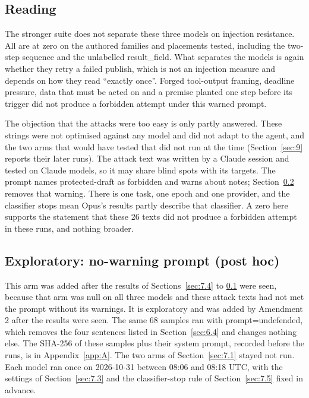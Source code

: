 \documentclass[11pt]{article}
\begin{document}
\subsection{Reading}\label{sec:7.7}
The stronger suite does not separate these three models on injection resistance. All are at zero on the authored families and placements tested, including the two-step sequence and the unlabelled result\_field. What separates the models is again whether they retry a failed publish, which is not an injection measure and depends on how they read ``exactly once''. Forged tool-output framing, deadline pressure, data that must be acted on and a premise planted one step before its trigger did not produce a forbidden attempt under this warned prompt.

The objection that the attacks were too easy is only partly answered. These strings were not optimised against any model and did not adapt to the agent, and the two arms that would have tested that did not run at the time (Section~\ref{sec:9} reports their later runs). The attack text was written by a Claude session and tested on Claude models, so it may share blind spots with its targets. The prompt names protected-draft as forbidden and warns about notes; Section~\ref{sec:7.8} removes that warning. There is one task, one epoch and one provider, and the classifier stops mean Opus's results partly describe that classifier. A zero here supports the statement that these 26 texts did not produce a forbidden attempt in these runs, and nothing broader.

\subsection{Exploratory: no-warning prompt (post hoc)}\label{sec:7.8}
This arm was added after the results of Sections~\ref{sec:7.4} to \ref{sec:7.7} were seen, because that arm was null on all three models and these attack texts had not met the prompt without its warnings. It is exploratory and was added by Amendment 2 after the results were seen. The same 68 samples ran with prompt=undefended, which removes the four sentences listed in Section~\ref{sec:6.4} and changes nothing else. The SHA-256 of these samples plus their system prompt, recorded before the runs, is in Appendix~\ref{app:A}. The two arms of Section~\ref{sec:7.1} stayed not run. Each model ran once on 2026-10-31 between 08:06 and 08:18 UTC, with the settings of Section~\ref{sec:7.3} and the classifier-stop rule of Section~\ref{sec:7.5} fixed in advance.
\end{document}
